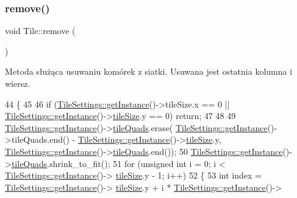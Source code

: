 \mbox{\label{class_tile_a9f5897287ec33ef87fe88a2b254d1837}} 
\subsubsection{\texorpdfstring{remove()}{remove()}}
{\footnotesize\ttfamily void Tile\+::remove (\begin{DoxyParamCaption}{ }\end{DoxyParamCaption})}

Metoda służąca usuwaniu komórek z siatki. Usuwana jest ostatnia kolumna i wiersz. 
\begin{DoxyCode}
44 \{
45 
46     \textcolor{keywordflow}{if} (\mbox{\hyperlink{class_tile_settings_a003ae6e78b97855c8592b2b4c0818914}{TileSettings::getInstance}}()->tileSize.x == 0 || 
      \mbox{\hyperlink{class_tile_settings_a003ae6e78b97855c8592b2b4c0818914}{TileSettings::getInstance}}()->\mbox{\hyperlink{class_tile_settings_ae4be54be3619d21d536ce13b7354f165}{tileSize}}.y == 0) \textcolor{keywordflow}{return};
47 
48 
49     \mbox{\hyperlink{class_tile_settings_a003ae6e78b97855c8592b2b4c0818914}{TileSettings::getInstance}}()->\mbox{\hyperlink{class_tile_settings_ac37d7b95a1e2266d38de0a70a907efb3}{tileQuads}}.erase(
      \mbox{\hyperlink{class_tile_settings_a003ae6e78b97855c8592b2b4c0818914}{TileSettings::getInstance}}()->tileQuads.end() - 
      \mbox{\hyperlink{class_tile_settings_a003ae6e78b97855c8592b2b4c0818914}{TileSettings::getInstance}}()->\mbox{\hyperlink{class_tile_settings_ae4be54be3619d21d536ce13b7354f165}{tileSize}}.y, 
      \mbox{\hyperlink{class_tile_settings_a003ae6e78b97855c8592b2b4c0818914}{TileSettings::getInstance}}()->\mbox{\hyperlink{class_tile_settings_ac37d7b95a1e2266d38de0a70a907efb3}{tileQuads}}.end());
50     \mbox{\hyperlink{class_tile_settings_a003ae6e78b97855c8592b2b4c0818914}{TileSettings::getInstance}}()->\mbox{\hyperlink{class_tile_settings_ac37d7b95a1e2266d38de0a70a907efb3}{tileQuads}}.shrink\_to\_fit();
51     \textcolor{keywordflow}{for} (\textcolor{keywordtype}{unsigned} \textcolor{keywordtype}{int} i = 0; i < \mbox{\hyperlink{class_tile_settings_a003ae6e78b97855c8592b2b4c0818914}{TileSettings::getInstance}}()->
      \mbox{\hyperlink{class_tile_settings_ae4be54be3619d21d536ce13b7354f165}{tileSize}}.y - 1; i++)
52     \{
53         \textcolor{keywordtype}{int} index = \mbox{\hyperlink{class_tile_settings_a003ae6e78b97855c8592b2b4c0818914}{TileSettings::getInstance}}()->
      \mbox{\hyperlink{class_tile_settings_ae4be54be3619d21d536ce13b7354f165}{tileSize}}.y + i * \mbox{\hyperlink{class_tile_settings_a003ae6e78b97855c8592b2b4c0818914}{TileSettings::getInstance}}()->

\end{DoxyCode}
